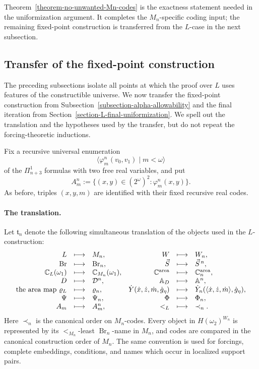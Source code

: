 \documentclass[a4paper,11pt]{article}
\newcommand{\forceC}{\mathbb{C}}
\begin{document}
Theorem~\ref{theorem-no-unwanted-Mn-codes} is the exactness statement needed
in the uniformization argument.  It completes the $M_n$-specific coding
input; the remaining fixed-point construction is transferred from the
$L$-case in the next subsection.


\subsection{Transfer of the fixed-point construction}
\label{subsection-Mn-transfer-fixed-point}

The preceding subsections isolate all points at which the proof over $L$
uses features of the constructible universe.  We now transfer the fixed-point
construction from Subsection~\ref{subsection-alpha-allowability} and the final
iteration from Section~\ref{section-L-final-uniformization}.  We spell out the
translation and the hypotheses used by the transfer, but do not repeat the
forcing-theoretic inductions.

Fix a recursive universal enumeration
\[
   \langle\varphi^n_m(v_0,v_1)\mid m<\omega\rangle
\]
of the $\Pi^1_{n+3}$ formulas with two free real variables, and put
\[
   A^n_m
   :=\{(x,y)\in(2^\omega)^2:\varphi^n_m(x,y)\}.
\]
As before, triples $(x,y,m)$ are identified with their fixed recursive real
codes.

\paragraph{The translation.}
Let $\mathfrak t_n$ denote the following simultaneous translation of the
objects used in the $L$-construction:
\[
\begin{array}{rcl@{\quad}rcl}
   L&\longmapsto&M_n,
   &W&\longmapsto&W_n,\\
   \operatorname{Br}&\longmapsto&\operatorname{Br}_n,
   &\vec S&\longmapsto&\vec S^{\,n},\\
   \mathbb C_L(\omega_1)&\longmapsto&\mathbb C_{M_n}(\omega_1),
   &\forceC^{\mathrm{area}}&\longmapsto&
      \forceC^{\mathrm{area}}_n,\\
   D&\longmapsto&\mathcal D^n,
   &\mathbb A_D&\longmapsto&\mathbb A^n,\\
   \text{the area map }\varrho_L&\longmapsto&\varrho_n,
   &\dot Y(\dot x,\dot z,\dot m,\dot g_\eta)&\longmapsto&
      \dot Y_n(\langle\dot x,\dot z,\dot m\rangle,\dot g_\eta),\\
   \Psi&\longmapsto&\Psi_n,
   &\Phi&\longmapsto&\Phi_n,\\
   A_m&\longmapsto&A^n_m,
   &<_L&\longmapsto&\prec_n.
\end{array}
\]
Here $\prec_n$ is the canonical order on $M_n$-codes.  Every object in
$H(\omega_2)^{W_n}$ is represented by its $<_{M_n}$-least
$\operatorname{Br}_n$-name in $M_n$, and codes are compared in the canonical
construction order of $M_n$.  The same convention is used for forcings,
complete embeddings, conditions, and names which occur in localized support
pairs.
\end{document}
